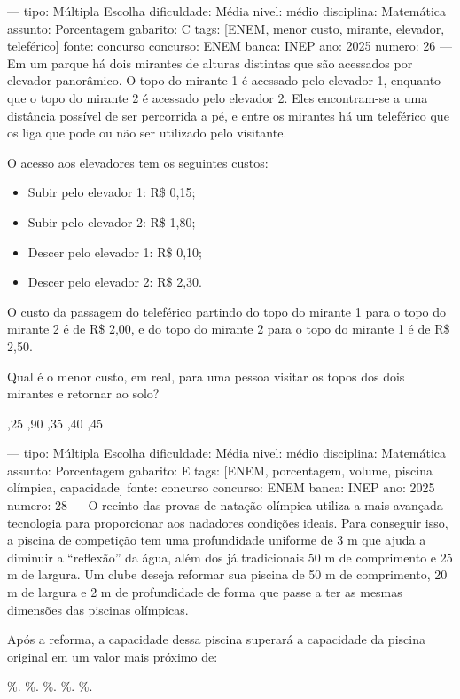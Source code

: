 ---
tipo: Múltipla Escolha
dificuldade: Média
nivel: médio
disciplina: Matemática
assunto: Porcentagem
gabarito: C
tags: [ENEM, menor custo, mirante, elevador, teleférico]
fonte: concurso
concurso: ENEM
banca: INEP
ano: 2025
numero: 26
---
\question
Em um parque há dois mirantes de alturas distintas que são acessados por elevador panorâmico. O topo do mirante 1 é acessado pelo elevador 1, enquanto que o topo do mirante 2 é acessado pelo elevador 2. Eles encontram-se a uma distância possível de ser percorrida a pé, e entre os mirantes há um teleférico que os liga que pode ou não ser utilizado pelo visitante.

O acesso aos elevadores tem os seguintes custos:
\begin{itemize}
\item Subir pelo elevador 1: R\$ 0,15;
\item Subir pelo elevador 2: R\$ 1,80;
\item Descer pelo elevador 1: R\$ 0,10;
\item Descer pelo elevador 2: R\$ 2,30.
\end{itemize}

O custo da passagem do teleférico partindo do topo do mirante 1 para o topo do mirante 2 é de R\$ 2,00, e do topo do mirante 2 para o topo do mirante 1 é de R\$ 2,50.

Qual é o menor custo, em real, para uma pessoa visitar os topos dos dois mirantes e retornar ao solo?
\begin{choices}
,25
,90
,35
,40
,45
\end{choices}

---
tipo: Múltipla Escolha
dificuldade: Média
nivel: médio
disciplina: Matemática
assunto: Porcentagem
gabarito: E
tags: [ENEM, porcentagem, volume, piscina olímpica, capacidade]
fonte: concurso
concurso: ENEM
banca: INEP
ano: 2025
numero: 28
---
\question
O recinto das provas de natação olímpica utiliza a mais avançada tecnologia para proporcionar aos nadadores condições ideais. Para conseguir isso, a piscina de competição tem uma profundidade uniforme de 3 m que ajuda a diminuir a ``reflexão'' da água, além dos já tradicionais 50 m de comprimento e 25 m de largura. Um clube deseja reformar sua piscina de 50 m de comprimento, 20 m de largura e 2 m de profundidade de forma que passe a ter as mesmas dimensões das piscinas olímpicas.

Após a reforma, a capacidade dessa piscina superará a capacidade da piscina original em um valor mais próximo de:
\begin{choices}
\%.
\%.
\%.
\%.
\%.
\end{choices}

